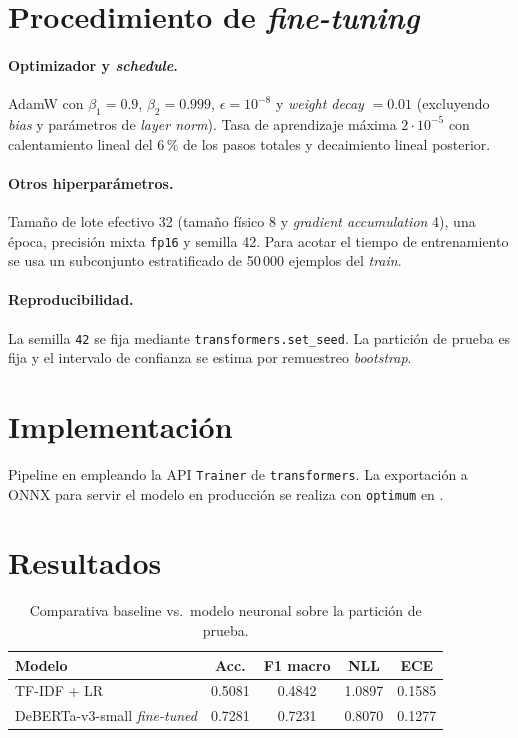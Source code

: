 \section{Procedimiento de \emph{fine-tuning}}

\paragraph{Optimizador y \emph{schedule}.} AdamW
\citep{loshchilov2019decoupled} con $\beta_1 = 0.9$, $\beta_2 = 0.999$,
$\epsilon = 10^{-8}$ y \emph{weight decay} $= 0.01$ (excluyendo
\emph{bias} y parámetros de \emph{layer norm}). Tasa de aprendizaje
máxima $2 \cdot 10^{-5}$ con calentamiento lineal del 6\,\% de los
pasos totales y decaimiento lineal posterior.

\paragraph{Otros hiperparámetros.} Tamaño de lote efectivo 32
(tamaño físico 8 y \emph{gradient accumulation} 4), una época,
precisión mixta \texttt{fp16} y semilla 42. Para acotar el tiempo de
entrenamiento se usa un subconjunto estratificado de 50\,000 ejemplos
del \emph{train}.

\paragraph{Reproducibilidad.} La semilla \texttt{42} se fija mediante
\texttt{transformers.set\_seed}. La partición de prueba es fija y el
intervalo de confianza se estima por remuestreo \emph{bootstrap}.

\section{Implementación}

Pipeline en 
empleando la API \texttt{Trainer} de \texttt{transformers}. La
exportación a ONNX para servir el modelo en producción se realiza con
\texttt{optimum} en .

\section{Resultados}

\begin{table}[h]
  \centering
  \begin{tabular}{lcccc}
    \toprule
    Modelo & Acc. & F1 macro & NLL & ECE \\
    \midrule
    TF-IDF + LR & 0.5081 & 0.4842 & 1.0897 & 0.1585 \\
    DeBERTa-v3-small \emph{fine-tuned} & 0.7281 & 0.7231 & 0.8070 & 0.1277 \\
    \bottomrule
  \end{tabular}
  \caption{Comparativa baseline vs.\ modelo neuronal sobre la partición
  de prueba.}
  \label{tab:deberta-vs-baseline}
\end{table}

